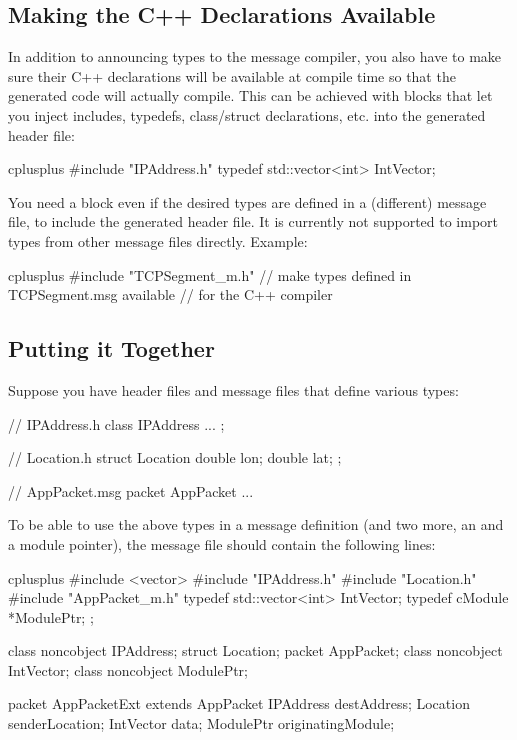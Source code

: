 \subsection{Making the C++ Declarations Available}

In addition to announcing types to the message compiler, you also have to make
sure their C++ declarations will be available at compile time so that the
generated code will actually compile. This can be achieved with
 blocks that let you inject includes, typedefs,
class/struct declarations, etc. into the generated header file:

\begin{msg}
cplusplus {{
#include "IPAddress.h"
typedef std::vector<int> IntVector;
}}
\end{msg}

You need a  block even if the desired types are defined
in a (different) message file, to include the generated header file.
It is currently not supported to import types from other message files directly.
Example:

\begin{msg}
cplusplus {{
#include "TCPSegment_m.h"  // make types defined in TCPSegment.msg available
                           // for the C++ compiler
}}
\end{msg}


\subsection{Putting it Together}

Suppose you have header files and message files that define various types:

\begin{cpp}
// IPAddress.h
class IPAddress {
   ...
};
\end{cpp}

\begin{cpp}
// Location.h
struct Location {
    double lon;
    double lat;
};
\end{cpp}

\begin{msg}
// AppPacket.msg
packet AppPacket {
   ...
}
\end{msg}

To be able to use the above types in a message definition (and two more,
an  and a module pointer), the message file should contain
the following lines:

\begin{msg}
cplusplus {{
#include <vector>
#include "IPAddress.h"
#include "Location.h"
#include "AppPacket_m.h"
typedef std::vector<int> IntVector;
typedef cModule *ModulePtr;
}};

class noncobject IPAddress;
struct Location;
packet AppPacket;
class noncobject IntVector;
class noncobject ModulePtr;

packet AppPacketExt extends AppPacket {
    IPAddress destAddress;
    Location senderLocation;
    IntVector data;
    ModulePtr originatingModule;
}
\end{msg}


